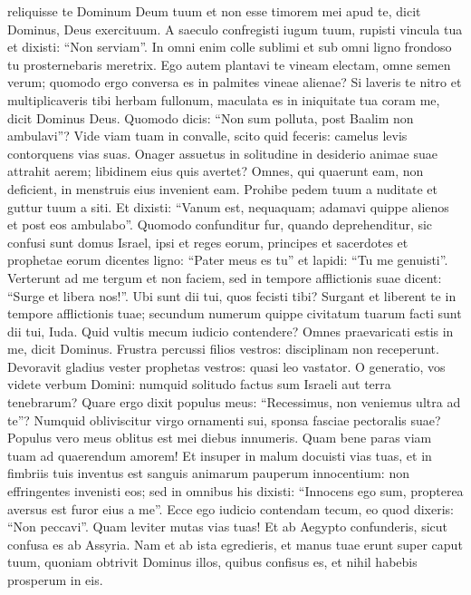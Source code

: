 \begin{biblechapter}
\begin{biblechapter}
 reliquisse te Dominum Deum tuum et non esse timorem mei apud te,
 dicit Dominus, Deus exercituum.
 \verse A saeculo confregisti iugum tuum,
 rupisti vincula tua
 et dixisti: “Non serviam”.
 In omni enim colle sublimi
 et sub omni ligno frondoso
 tu prosternebaris meretrix.
 \verse Ego autem plantavi te vineam electam,
 omne semen verum;
 quomodo ergo conversa es
 in palmites vineae alienae?
 \verse Si laveris te nitro
 et multiplicaveris tibi herbam fullonum,
 maculata es in iniquitate tua coram me,
 dicit Dominus Deus.
 \verse Quomodo dicis: “Non sum polluta,
 post Baalim non ambulavi”?
 Vide viam tuam in convalle,
 scito quid feceris:
 camelus levis contorquens vias suas.
 \verse Onager assuetus in solitudine
 in desiderio animae suae attrahit aerem;
 libidinem eius quis avertet?
 Omnes, qui quaerunt eam, non deficient,
 in menstruis eius invenient eam.
 \verse Prohibe pedem tuum a nuditate
 et guttur tuum a siti.
 Et dixisti: “Vanum est, nequaquam;
 adamavi quippe alienos
 et post eos ambulabo”.
 \verse Quomodo confunditur fur, quando deprehenditur,
 sic confusi sunt domus Israel,
 ipsi et reges eorum, principes
 et sacerdotes et prophetae eorum
 \verse dicentes ligno: “Pater meus es tu” et lapidi: “Tu me genuisti”.
 Verterunt ad me tergum et non faciem,
 sed in tempore afflictionis suae dicent:
 “Surge et libera nos!”.
 \verse Ubi sunt dii tui, quos fecisti tibi?
 Surgant et liberent te in tempore afflictionis tuae;
 secundum numerum quippe civitatum tuarum
 facti sunt dii tui, Iuda.
 \verse Quid vultis mecum iudicio contendere?
 Omnes praevaricati estis in me,
 dicit Dominus.
 \verse Frustra percussi filios vestros:
 disciplinam non receperunt.
 Devoravit gladius vester prophetas vestros:
 quasi leo vastator.
 \verse O generatio, vos videte verbum Domini:
 numquid solitudo factus sum Israeli
 aut terra tenebrarum?
 Quare ergo dixit populus meus: “Recessimus,
 non veniemus ultra ad te”?
 \verse Numquid obliviscitur virgo ornamenti sui,
 sponsa fasciae pectoralis suae?
 Populus vero meus oblitus est mei
 diebus innumeris.
 \verse Quam bene paras viam tuam
 ad quaerendum amorem!
 Et insuper in malum
 docuisti vias tuas,
 \verse et in fimbriis tuis inventus est
 sanguis animarum pauperum innocentium:
 non effringentes invenisti eos;
 sed in omnibus his
 \verse dixisti: “Innocens ego sum,
 propterea aversus est furor eius a me”.
 Ecce ego iudicio contendam tecum, eo quod dixeris: “Non peccavi”.
 \verse Quam leviter mutas vias tuas!
 Et ab Aegypto confunderis,
 sicut confusa es ab Assyria.
 \verse Nam et ab ista egredieris,
 et manus tuae erunt super caput tuum,
 quoniam obtrivit Dominus illos, quibus confisus es,
 et nihil habebis prosperum in eis.
 

\end{biblechapter}
\end{biblechapter}
